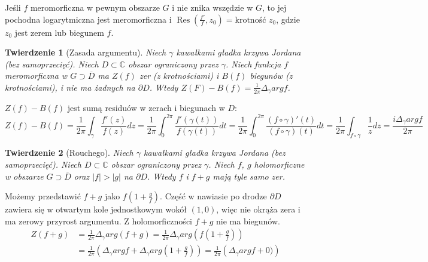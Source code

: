 \documentclass[11pt]{article}
\newcommand{\abs}[1]{\left|#1\right|} %
\newcommand{\closure}[1]{\overline{#1}} %
\newcommand{\res}{\mathop{\text{Res}}\limits} %
\theoremstyle{plain}
\newtheorem*{theorem}{Twierdzenie}
\theoremstyle{definition}
\theoremstyle{remark}
\let\oldendproof\endproof
\renewenvironment{proof}[1][\proofname]{
  \oldproof[\textsc{\small #1}]
}{\oldendproof}
\begin{document}
Jeśli $ f $ meromorficzna w pewnym obszarze $G$ i nie znika wszędzie w $G$,
to jej pochodna logarytmiczna jest meromorficzna i $ \res(\frac{f'}{f}, z_0) = \text{krotność } z_0 $,
gdzie $ z_0 $ jest zerem lub biegunem $f$.


\begin{theorem}[Zasada argumentu]
  Niech $\gamma$ kawałkami gładka krzywa Jordana (bez samoprzecięć).
  Niech $ D \subset \mathbb{C} $ obszar ograniczony przez $ \gamma $.
  Niech funkcja $f$ meromorficzna w $ G \supset \closure{D} $ ma $ Z(f) $ zer (z krotnościami) i $ B(f) $ biegunów (z krotnościami), i nie ma żadnych na $ \partial D $.
  Wtedy $ Z(F) - B(f) = \frac{1}{2 \pi} \Delta_{\gamma} arg f $.
\end{theorem}

\begin{proof}
  $ Z(f) - B(f) $ jest sumą residuów w zerach i biegunach w $ D $: %
  $$
    Z(f) - B(f)
    = \frac{1}{2 \pi} \int_{\gamma} \frac{f'(z)}{f(z)} dz
    = \frac{1}{2 \pi} \int_{0}^{2 \pi} \frac{f'(\gamma(t))}{f(\gamma(t))} dt
    = \frac{1}{2 \pi} \int_{0}^{2 \pi} \frac{(f \circ \gamma)'(t)}{(f \circ \gamma)(t)} dt
    = \frac{1}{2 \pi} \int_{f \circ \gamma} \frac{1}{z} dz
    = \frac{i \Delta_{\gamma} arg f}{2 \pi}
  $$
\end{proof}

\begin{theorem}[Rouchego]
  Niech $\gamma$ kawałkami gładka krzywa Jordana (bez samoprzecięć).
  Niech $ D \subset \mathbb{C} $ obszar ograniczony przez $ \gamma $.
  Niech $f$, $g$ holomorficzne w obszarze $ G \supset \closure{D} $ oraz $ \abs{f} > \abs{g} $ na $ \partial D $.
  Wtedy $f$ i $f+g$ mają tyle samo zer.
\end{theorem}


\begin{proof}
  Możemy przedstawić $ f+g $ jako $ f(1+\frac{g}{f}) $.
  Część w nawiasie po drodze $ \partial D $ zawiera się w otwartym kole jednostkowym wokół $ (1, 0) $, więc nie okrąża zera i ma zerowy przyrost argumentu.
  Z holomorficzności $f+g$ nie ma biegunów.
  \begin{align*}
    Z(f+g) &
    = \frac{1}{2 \pi} \Delta_{\gamma} arg(f+g)
    = \frac{1}{2 \pi} \Delta_{\gamma} arg \left( f\left(1+\frac{g}{f}\right) \right) \\ &
    = \frac{1}{2 \pi} \left( \Delta_{\gamma} arg f + \Delta_{\gamma} arg\left(1+\frac{g}{f}\right) \right)
    = \frac{1}{2 \pi} \left( \Delta_{\gamma} arg f + 0) \right)
  \end{align*}
\end{proof}
\end{document}
